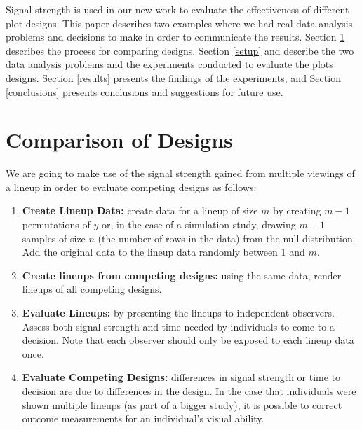 
 
Signal strength is used in our new work to evaluate the effectiveness of different plot designs. This paper describes two examples where we had real data analysis problems and decisions to make in order to communicate the results. Section \ref{designs} describes the process for comparing designs. Section \ref{setup} and describe the two data analysis problems and the experiments conducted to evaluate the plots designs. Section \ref{results} presents the findings of the experiments, and Section \ref{conclusions} presents conclusions and suggestions for future use.

\section{Comparison of Designs}\label{designs}
We are going to make use of the signal strength gained from multiple viewings of a lineup in order to evaluate competing designs as follows:
\begin{enumerate}
\item{{\bf Create Lineup Data:} create data for a lineup of size $m$ by  creating  $m-1$ permutations of $y$ or, in the case of a simulation study, drawing $m-1$ samples of size $n$ (the number of rows in the data) from the null distribution. Add the original data to the lineup data randomly between 1 and $m$. }
\item{{\bf Create lineups from competing designs:} using the same data, render lineups of all competing designs. }
\item{{\bf Evaluate Lineups:} by presenting the lineups to independent observers. Assess both signal strength and time needed by individuals to come to a decision. Note that each observer should only be exposed to each lineup data once.}
\item{{\bf Evaluate Competing Designs:} differences in signal strength or time to decision are due to differences in the design. In the case that individuals were shown multiple lineups (as part of a bigger study), it is possible to correct outcome measurements for an individual's visual ability. }
\end{enumerate}

